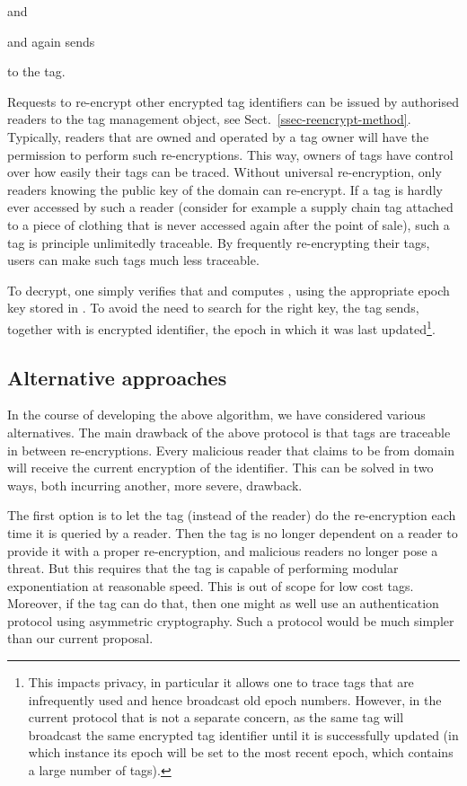 and

and again sends

to the tag.

Requests to re-encrypt other encrypted tag identifiers can be issued by
authorised readers to the tag management object, see
Sect.~\ref{ssec-reencrypt-method}.
Typically, readers that are owned and operated by a tag owner will have the
permission to perform such re-encryptions. This way, owners of tags have
control over how easily their tags can be traced. 
Without universal re-encryption, only readers knowing the public key of the
domain can re-encrypt. If a tag is hardly ever accessed by such a reader
(consider for example a supply chain tag attached to a piece of clothing that
is never accessed again after the point of sale), such a tag is principle
unlimitedly traceable. By frequently re-encrypting
their tags, users can make such tags much less traceable. 

To decrypt, one simply verifies that  and
computes , using the appropriate epoch key
stored in . To avoid the need to search for the right key, the tag
sends, together with is encrypted identifier, the epoch in which it was last
updated\footnote{This impacts privacy, in particular it allows one to trace 
  tags that are infrequently used and hence broadcast old epoch numbers.
  However, in the current protocol that is not a separate concern, as the same
  tag will broadcast the same encrypted tag identifier until it is successfully 
  updated (in which instance its epoch will be set to the most recent epoch,
  which contains a large number of tags).}.



\subsection{Alternative approaches}

In the course of developing the above algorithm, we have considered various
alternatives. The main drawback of the above protocol is that tags are
traceable in between re-encryptions. Every malicious reader that claims to be
from domain  will receive the current encryption of the
identifier. This can be solved in two ways, both incurring another, more
severe, drawback.

The first option is to let the tag (instead of the reader) do the re-encryption
each time it is queried by a reader. Then the tag is no longer dependent on a
reader to provide it with a proper re-encryption, and malicious readers no longer
pose a threat. But this requires that the tag is capable of performing modular
exponentiation at reasonable speed. This is out of scope for low cost
tags. Moreover, if the tag can do that, then one might as well use an
authentication protocol using asymmetric cryptography. Such a protocol would be
much simpler than our current proposal.

